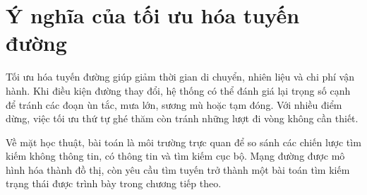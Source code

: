 \section{Ý nghĩa của tối ưu hóa tuyến đường}

Tối ưu hóa tuyến đường giúp giảm thời gian di chuyển, nhiên liệu và chi phí vận
hành. Khi điều kiện đường thay đổi, hệ thống có thể đánh giá lại trọng số cạnh
để tránh các đoạn ùn tắc, mưa lớn, sương mù hoặc tạm đóng. Với nhiều điểm dừng,
việc tối ưu thứ tự ghé thăm còn tránh những lượt đi vòng không cần thiết.

Về mặt học thuật, bài toán là môi trường trực quan để so sánh các chiến lược
tìm kiếm không thông tin, có thông tin và tìm kiếm cục bộ. Mạng đường được mô
hình hóa thành đồ thị, còn yêu cầu tìm tuyến trở thành một bài toán tìm kiếm
trạng thái được trình bày trong chương tiếp theo.
